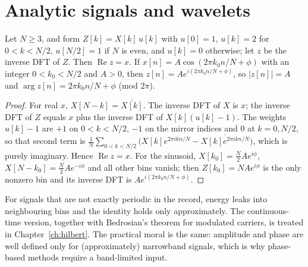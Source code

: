 \section{Analytic signals and wavelets}
\begin{theorem}\label{ars:filt-002}
Let $N\ge3$, and form $Z[k]=X[k]\,u[k]$ with $u[0]=1$, $u[k]=2$ for $0<k<N/2$, $u[N/2]=1$ if $N$ is even, and $u[k]=0$ otherwise; let $z$ be the inverse DFT of $Z$. Then $\operatorname{Re}z=x$. If $x[n]=A\cos(2\pi k_0n/N+\phi)$ with an integer $0<k_0<N/2$ and $A>0$, then $z[n]=Ae^{i(2\pi k_0n/N+\phi)}$, so $|z[n]|=A$ and $\arg z[n]=2\pi k_0n/N+\phi$ (mod $2\pi$).
\end{theorem}
\begin{proof}
For real $x$, $X[N-k]=\overline{X[k]}$. The inverse DFT of $X$ is $x$; the inverse DFT of $Z$ equals $x$ plus the inverse DFT of $X[k](u[k]-1)$. The weights $u[k]-1$ are $+1$ on $0<k<N/2$, $-1$ on the mirror indices and $0$ at $k=0,N/2$, so that second term is $\frac1N\sum_{0<k<N/2}\bigl(X[k]e^{2\pi ikn/N}-\overline{X[k]e^{2\pi ikn/N}}\bigr)$, which is purely imaginary. Hence $\operatorname{Re}z=x$. For the sinusoid, $X[k_0]=\tfrac N2Ae^{i\phi}$, $X[N-k_0]=\tfrac N2Ae^{-i\phi}$ and all other bins vanish; then $Z[k_0]=NAe^{i\phi}$ is the only nonzero bin and its inverse DFT is $Ae^{i(2\pi k_0n/N+\phi)}$.
\end{proof}
For signals that are not exactly periodic in the record, energy leaks into neighbouring bins and the identity holds only approximately. The continuous-time version, together with Bedrosian's theorem for modulated carriers, is treated in Chapter~\ref{ch:hilbert}. The practical moral is the same: amplitude and phase are well defined only for (approximately) narrowband signals, which is why phase-based methods require a band-limited input.

